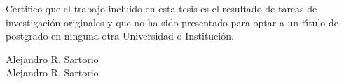 
%
%

\renewcommand{\tablename}{Tabla}
\renewcommand{\listtablename}{{\'I}ndice de tablas}



\thispagestyle{empty}%
Certifico que el trabajo incluido en esta tesis es el resultado de tareas de investigaci{\'o}n originales y que
no ha sido presentado para optar a un t{\'\i}tulo de postgrado en ninguna otra
Universidad o Instituci{\'o}n.\\
\vspace{1cm}
\begin{flushright}
\large{}\selectfont
Alejandro R. Sartorio \\
\normalsize\sffamily
Alejandro R. Sartorio
\end{flushright}

%

%

%
%

\tableofcontents \listoffigures \listoftables






















%





